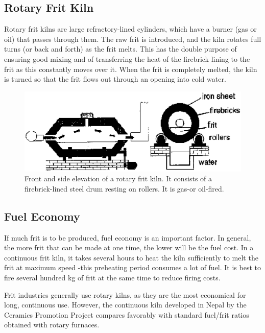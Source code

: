 \subsection{Rotary Frit Kiln}
Rotary frit kilns are large refractory-lined cylinders, which have a burner 
(gas or oil) that passes through them. The raw frit is introduced, and the kiln 
rotates full turns (or back and forth) as the frit melts. This has the double 
purpose of ensuring good mixing and of transferring the heat of the firebrick 
lining to the frit as this constantly moves over it. When the frit is 
completely melted, the kiln is turned so that the frit flows out through an 
opening into cold water.
\begin{figure}[htbp!]
  \centering
  \includegraphics[width=0.8\linewidth]{img/rotarykiln.eps}
  \caption{Front and side elevation of a rotary frit kiln. It consists of a 
  firebrick-lined steel drum resting on rollers. It is gas-or oil-fired.}
  \label{fig:rotarykiln}
\end{figure}
\subsection{Fuel Economy}
If much frit is to be produced, fuel economy is an important factor. In 
general, the more frit that can be made at one time, the lower will be the fuel 
cost. In a continuous frit kiln, it takes several hours to heat the kiln 
sufficiently to melt the frit at maximum speed -this preheating period consumes 
a lot of fuel. It is best to fire several hundred kg of frit at the same time 
to reduce firing costs.

Frit industries generally use rotary kilns, as they are the most economical for 
long, continuous use. However, the continuous kiln developed in Nepal by the 
Ceramics Promotion Project compares favorably with standard fuel/frit ratios 
obtained with rotary furnaces.

